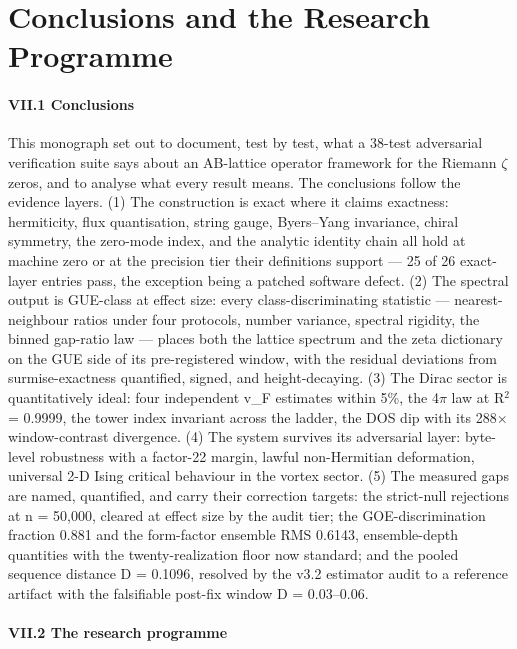 \documentclass[10pt]{article}
\begin{document}
\section{Conclusions and the Research Programme}

\paragraph{VII.1 Conclusions}

This monograph set out to document, test by test, what a 38-test adversarial verification suite says about an AB-lattice operator framework for the Riemann $\zeta$ zeros, and to analyse what every result means. The conclusions follow the evidence layers. (1) The construction is exact where it claims exactness: hermiticity, flux quantisation, string gauge, Byers--Yang invariance, chiral symmetry, the zero-mode index, and the analytic identity chain all hold at machine zero or at the precision tier their definitions support --- 25 of 26 exact-layer entries pass, the exception being a patched software defect. (2) The spectral output is GUE-class at effect size: every class-discriminating statistic --- nearest-neighbour ratios under four protocols, number variance, spectral rigidity, the binned gap-ratio law --- places both the lattice spectrum and the zeta dictionary on the GUE side of its pre-registered window, with the residual deviations from surmise-exactness quantified, signed, and height-decaying. (3) The Dirac sector is quantitatively ideal: four independent v\_F estimates within 5\%, the 4$\pi$ law at R$^2$ = 0.9999, the tower index invariant across the ladder, the DOS dip with its 288$\times$ window-contrast divergence. (4) The system survives its adversarial layer: byte-level robustness with a factor-22 margin, lawful non-Hermitian deformation, universal 2-D Ising critical behaviour in the vortex sector. (5) The measured gaps are named, quantified, and carry their correction targets: the strict-null rejections at n = 50,000, cleared at effect size by the audit tier; the GOE-discrimination fraction 0.881 and the form-factor ensemble RMS 0.6143, ensemble-depth quantities with the twenty-realization floor now standard; and the pooled sequence distance D = 0.1096, resolved by the v3.2 estimator audit to a reference artifact with the falsifiable post-fix window D = 0.03--0.06.

\paragraph{VII.2 The research programme}
\end{document}
